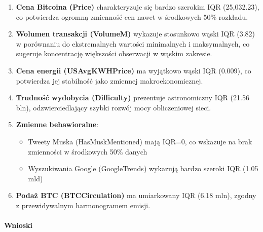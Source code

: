 \documentclass[
  11pt,
]{article}
\providecommand{\tightlist}{%
  \setlength{\itemsep}{0pt}\setlength{\parskip}{0pt}}
\begin{document}
\begin{enumerate}
\def\labelenumi{\arabic{enumi}.}
\item
  \textbf{Cena Bitcoina (Price)} charakteryzuje się bardzo szerokim IQR
  (25,032.23), co potwierdza ogromną zmienność cen nawet w środkowych
  50\% rozkładu.
\item
  \textbf{Wolumen transakcji (VolumeM)} wykazuje stosunkowo wąski IQR
  (3.82) w porównaniu do ekstremalnych wartości minimalnych i
  maksymalnych, co sugeruje koncentrację większości obserwacji w wąskim
  zakresie.
\item
  \textbf{Cena energii (USAvgKWHPrice)} ma wyjątkowo wąski IQR (0.009),
  co potwierdza jej stabilność jako zmiennej makroekonomicznej.
\item
  \textbf{Trudność wydobycia (Difficulty)} prezentuje astronomiczny IQR
  (21.56 bln), odzwierciedlający szybki rozwój mocy obliczeniowej sieci.
\item
  \textbf{Zmienne behawioralne}:

  \begin{itemize}
  \tightlist
  \item
    Tweety Muska (HasMuskMentioned) mają IQR=0, co wskazuje na brak
    zmienności w środkowych 50\% danych
  \item
    Wyszukiwania Google (GoogleTrends) wykazują bardzo szeroki IQR (1.05
    mld)
  \end{itemize}
\item
  \textbf{Podaż BTC (BTCCirculation)} ma umiarkowany IQR (6.18 mln),
  zgodny z przewidywalnym harmonogramem emisji.
\end{enumerate}

\paragraph{Wnioski}\label{wnioski-6}
\end{document}
